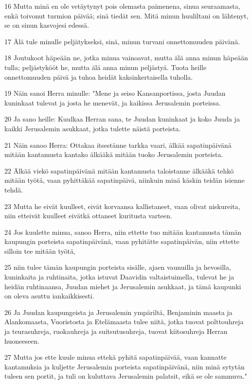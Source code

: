 \par 16 Mutta minä en ole vetäytynyt pois olemasta paimenena, sinua seuraamasta, enkä toivonut turmion päivää; sinä tiedät sen. Mitä minun huuliltani on lähtenyt, se on sinun kasvojesi edessä.
\par 17 Älä tule minulle peljätykseksi, sinä, minun turvani onnettomuuden päivänä.
\par 18 Joutukoot häpeään ne, jotka minua vainoavat, mutta älä anna minun häpeään tulla; peljästykööt he, mutta älä anna minun peljästyä. Tuota heille onnettomuuden päivä ja tuhoa heidät kaksinkertaisella tuholla.
\par 19 Näin sanoi Herra minulle: "Mene ja seiso Kansanportissa, josta Juudan kuninkaat tulevat ja josta he menevät, ja kaikissa Jerusalemin porteissa.
\par 20 Ja sano heille: Kuulkaa Herran sana, te Juudan kuninkaat ja koko Juuda ja kaikki Jerusalemin asukkaat, jotka tulette näistä porteista.
\par 21 Näin sanoo Herra: Ottakaa itsestänne tarkka vaari, älkää sapatinpäivänä mitään kantamusta kantako älkääkä mitään tuoko Jerusalemin porteista.
\par 22 Älkää viekö sapatinpäivänä mitään kantamusta taloistanne älkääkä tehkö mitään työtä, vaan pyhittäkää sapatinpäivä, niinkuin minä käskin teidän isienne tehdä.
\par 23 Mutta he eivät kuulleet, eivät korvaansa kallistaneet, vaan olivat niskureita, niin etteivät kuulleet eivätkä ottaneet kuritusta varteen.
\par 24 Jos kuulette minua, sanoo Herra, niin ettette tuo mitään kantamusta tämän kaupungin porteista sapatinpäivänä, vaan pyhitätte sapatinpäivän, niin ettette silloin tee mitään työtä,
\par 25 niin tulee tämän kaupungin porteista sisälle, ajaen vaunuilla ja hevosilla, kuninkaita ja ruhtinaita, jotka istuvat Daavidin valtaistuimella, tulevat he ja heidän ruhtinaansa, Juudan miehet ja Jerusalemin asukkaat, ja tämä kaupunki on oleva asuttu iankaikkisesti.
\par 26 Ja Juudan kaupungeista ja Jerusalemin ympäriltä, Benjaminin maasta ja Alankomaasta, Vuoristosta ja Etelämaasta tulee niitä, jotka tuovat polttouhreja ja teurasuhreja, ruokauhreja ja suitsutusuhreja, tuovat kiitosuhreja Herran huoneeseen.
\par 27 Mutta jos ette kuule minua ettekä pyhitä sapatinpäivää, vaan kannatte kantamuksia ja kuljette Jerusalemin porteista sapatinpäivänä, niin minä sytytän tuleen sen portit, ja tuli on kuluttava Jerusalemin palatsit, eikä se ole sammuva."

